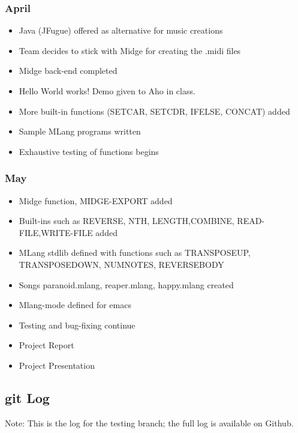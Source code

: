 \documentclass[letterpaper,11pt]{article}
\begin{document}
{\begin{itemize}
    \end{itemize}

\subsubsection{April}

\begin{itemize}
\item Java (JFugue) offered as alternative for music creations
\item Team decides to stick with Midge for creating the .midi files
\item Midge back-end completed
\item Hello World works! Demo given to Aho in class.
\item More built-in functions (SETCAR, SETCDR, IFELSE, CONCAT) added
\item Sample MLang programs written
\item Exhaustive testing of functions begins

    \end{itemize}

\subsubsection{May}

\begin{itemize}
\item Midge function, MIDGE-EXPORT added
\item Built-ins such as REVERSE, NTH, LENGTH,COMBINE, READ-FILE,WRITE-FILE added
\item MLang stdlib defined with functions such as TRANSPOSEUP, TRANSPOSEDOWN, NUMNOTES, REVERSEBODY
\item Songs paranoid.mlang, reaper.mlang, happy.mlang created
\item Mlang-mode defined for emacs
\item Testing and bug-fixing continue
\item Project Report
\item Project Presentation

    \end{itemize}


\subsection{git Log}
Note: This is the log for the testing branch; the full log is available on Github.


}
\end{document}
